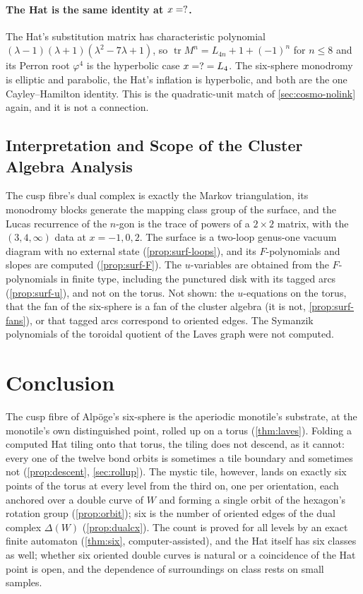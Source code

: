 \documentclass[11pt,a4paper]{article}
\theoremstyle{plain}
\theoremstyle{definition}
\begin{document}
\paragraph{The Hat is the same identity at $x=?$.} The Hat's substitution matrix has characteristic polynomial $(\lambda-1)(\lambda+1)(\lambda^2-7\lambda+1)$, so
$\operatorname{tr}M^n=L_{4n}+1+(-1)^n$ for $n\le8$ and its Perron root $\varphi^4$ is the hyperbolic case $x=?=L_4$. The six-sphere monodromy is elliptic and parabolic, the
Hat's inflation is hyperbolic, and both are the one Cayley--Hamilton identity. This is the quadratic-unit match of \cref{sec:cosmo-nolink} again, and it is not a connection.

\subsection{Interpretation and Scope of the Cluster Algebra Analysis}

The cusp fibre's dual complex is exactly the Markov triangulation, its monodromy blocks generate the mapping class group of the surface, and the Lucas recurrence
of the $n$-gon is the trace of powers of a $2\times2$ matrix, with the $(3,4,\infty)$ data at $x=-1,0,2$. The surface is a two-loop genus-one vacuum diagram with no external state (\cref{prop:surf-loops}), and its $F$-polynomials and slopes are computed (\cref{prop:surf-F}). The $u$-variables are obtained from the $F$-polynomials in finite type, including the punctured disk with its tagged arcs (\cref{prop:surf-u}), and not on the torus. Not shown: the $u$-equations on the torus, that the
fan of the six-sphere is a fan of the cluster algebra (it is not, \cref{prop:surf-fans}), or that tagged arcs correspond to oriented edges. The Symanzik polynomials of the
toroidal quotient of the Laves graph were not computed.


\section{Conclusion}
\label{sec:conclusion}

The cusp fibre of Alpöge's six-sphere is the aperiodic monotile's substrate, at
the monotile's own distinguished point, rolled up on a torus
(\cref{thm:laves}). Folding a computed Hat tiling onto that torus, the tiling does
not descend, as it cannot: every one of the twelve bond orbits is sometimes a tile
boundary and sometimes not (\cref{prop:descent}, \cref{sec:rollup}). The mystic
tile, however, lands on exactly six points of the torus at every level from the
third on, one per orientation, each anchored over a double curve of $W$ and forming a
single orbit of the hexagon's rotation group (\cref{prop:orbit}); six is the number of
oriented edges of the dual complex $\Delta(W)$ (\cref{prop:dualcx}). The count is
proved for all levels by an exact finite automaton (\cref{thm:six}, computer-assisted),
and the Hat itself has six classes as well; whether six oriented double curves is
natural or a coincidence of the Hat point is open, and the dependence of surroundings
on class rests on small samples.
\end{document}
